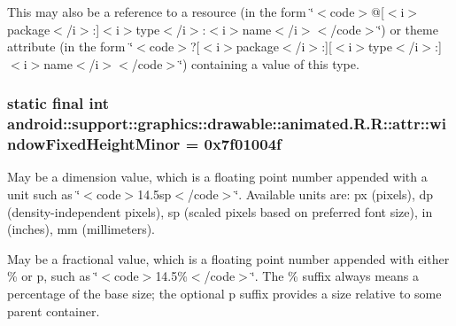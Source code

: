 This may also be a reference to a resource (in the form \char`\"{}$<$code$>$@\mbox{[}$<$i$>$package$<$/i$>$:\mbox{]}$<$i$>$type$<$/i$>$:$<$i$>$name$<$/i$>$$<$/code$>$\char`\"{}) or theme attribute (in the form \char`\"{}$<$code$>$?\mbox{[}$<$i$>$package$<$/i$>$:\mbox{]}\mbox{[}$<$i$>$type$<$/i$>$:\mbox{]}$<$i$>$name$<$/i$>$$<$/code$>$\char`\"{}) containing a value of this type. \hypertarget{classandroid_1_1support_1_1graphics_1_1drawable_1_1animated_1_1_r_1_1attr_daee97ad6a52fc5f8e4e937917168199}{
\subsubsection[{windowFixedHeightMinor}]{\setlength{\rightskip}{0pt plus 5cm}static final int android::support::graphics::drawable::animated.R.R::attr::windowFixedHeightMinor = 0x7f01004f}}
\label{classandroid_1_1support_1_1graphics_1_1drawable_1_1animated_1_1_r_1_1attr_daee97ad6a52fc5f8e4e937917168199}


May be a dimension value, which is a floating point number appended with a unit such as \char`\"{}$<$code$>$14.5sp$<$/code$>$\char`\"{}. Available units are: px (pixels), dp (density-independent pixels), sp (scaled pixels based on preferred font size), in (inches), mm (millimeters). 

May be a fractional value, which is a floating point number appended with either \% or p, such as \char`\"{}$<$code$>$14.5\%$<$/code$>$\char`\"{}. The \% suffix always means a percentage of the base size; the optional p suffix provides a size relative to some parent container. 

